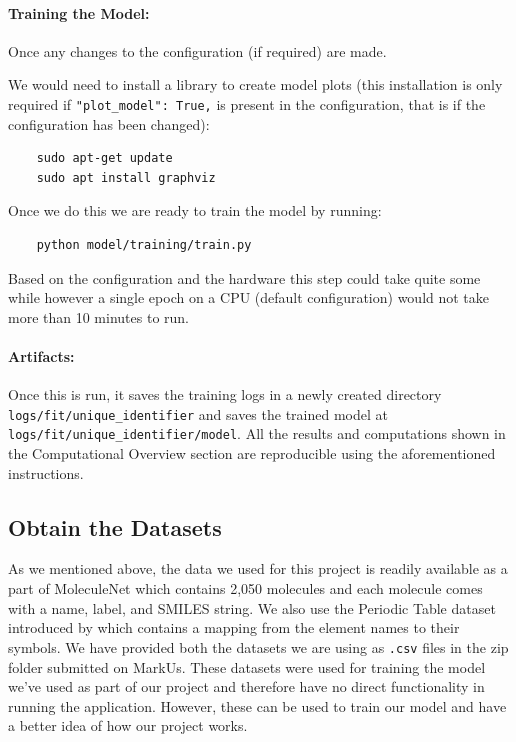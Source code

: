 \documentclass[fontsize=11pt]{article}
\begin{document}
\paragraph{Training the Model:} Once any changes to the configuration (if required) are made.

We would need to install a library to create model plots (this installation is only required if \texttt{"plot\_model": True,} is present in the configuration, that is if the configuration has been changed):

\begin{verbatim}
    sudo apt-get update
    sudo apt install graphviz
\end{verbatim}

Once we do this we are ready to train the model by running:

\begin{verbatim}
    python model/training/train.py
\end{verbatim}

Based on the configuration and the hardware this step could take quite some while however a single epoch on a CPU (default configuration) would not take more than 10 minutes to run.

\paragraph{Artifacts:} Once this is run, it saves the training logs in a newly created directory \texttt{logs/fit/unique\_identifier} and saves the trained model at \texttt{logs/fit/unique\_identifier/model}. All the results and computations shown in the Computational Overview section are reproducible using the aforementioned instructions.

\subsection*{Obtain the Datasets}

As we mentioned above, the data we used for this project is readily available as a part of MoleculeNet \citep{wu2018moleculenet} which contains 2,050 molecules and each molecule comes with a name, label, and SMILES string. We also use the Periodic Table dataset introduced by \cite{periodicdataset} which contains a mapping from the element names to their symbols. We have provided both the datasets we are using as \texttt{.csv} files in the zip folder submitted on MarkUs. These datasets were used for training the model we've used as part of our project and therefore have no direct functionality in running the application. However, these can be used to train our model and have a better idea of how our project works.
\end{document}
